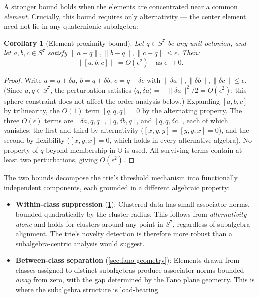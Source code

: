 \documentclass[11pt,a4paper]{article}
\newtheorem{corollary}[theorem]{Corollary}
\theoremstyle{definition}
\theoremstyle{remark}
\newcommand{\Oct}{\mathbb{O}}
\begin{document}
A stronger bound holds when the elements are concentrated near a common \emph{element}. Crucially, this bound requires only alternativity --- the center element need not lie in any quaternionic subalgebra:

\begin{corollary}[Element proximity bound]
\label{cor:element-proximity}
Let $q \in S^7$ be any unit octonion, and let $a, b, c \in S^7$ satisfy $\lVert a - q \rVert, \lVert b - q \rVert, \lVert c - q \rVert \leq \epsilon$. Then:
\begin{equation}
  \lVert [a, b, c] \rVert = O(\epsilon^2) \quad \text{as } \epsilon \to 0.
  \label{eq:element-proximity-bound}
\end{equation}
\end{corollary}

\begin{proof}
Write $a = q + \delta a$, $b = q + \delta b$, $c = q + \delta c$ with $\lVert \delta a \rVert, \lVert \delta b \rVert, \lVert \delta c \rVert \leq \epsilon$. (Since $a, q \in S^7$, the perturbation satisfies $\langle q, \delta a \rangle = -\lVert \delta a \rVert^2 / 2 = O(\epsilon^2)$; this sphere constraint does not affect the order analysis below.) Expanding $[a,b,c]$ by trilinearity, the $O(1)$ term $[q,q,q] = 0$ by the alternating property. The three $O(\epsilon)$ terms are $[\delta a, q, q]$, $[q, \delta b, q]$, and $[q, q, \delta c]$, each of which vanishes: the first and third by alternativity ($[x, y, y] = [y, y, x] = 0$), and the second by flexibility ($[x, y, x] = 0$, which holds in every alternative algebra). No property of $q$ beyond membership in $\Oct$ is used. All surviving terms contain at least two perturbations, giving $O(\epsilon^2)$.
\end{proof}

The two bounds decompose the trie's threshold mechanism into functionally independent components, each grounded in a different algebraic property:

\begin{itemize}[nosep]
  \item \textbf{Within-class suppression} (\cref{cor:element-proximity}): Clustered data has small associator norms, bounded quadratically by the cluster radius. This follows from \emph{alternativity alone} and holds for clusters around any point in $S^7$, regardless of subalgebra alignment. The trie's novelty detection is therefore more robust than a subalgebra-centric analysis would suggest.
  \item \textbf{Between-class separation} (\cref{sec:fano-geometry}): Elements drawn from classes assigned to distinct subalgebras produce associator norms bounded \emph{away} from zero, with the gap determined by the Fano plane geometry. This is where the subalgebra structure is load-bearing.
\end{itemize}
\end{document}
